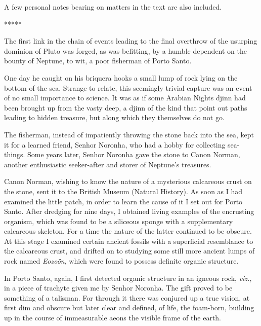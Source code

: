 \documentclass[a4paper, 12pt, oneside, landscape]{article}
\begin{document}
A few personal notes bearing on matters in the text are also included.

\centerline{*\hspace{15mm}*\hspace{15mm}*\hspace{15mm}*\hspace{15mm}*}
\bigskip

The first link in the chain of events leading to the final overthrow of the usurping dominion of Pluto was forged, as was befitting, by a humble dependent on the bounty of Neptune, to wit, a poor fisherman of Porto Santo.

One day he caught on his briquera hooks a small lump of rock lying on the bottom of the sea. Strange to relate, this seemingly trivial capture was an event of no small importance to science. It was as if some Arabian Nights djinn had been brought up from the vasty deep, a djinn of the kind that point out paths leading to hidden treasure, but along which they themselves do not go.

The fisherman, instead of impatiently throwing the stone back into the sea, kept it for a learned friend, Senhor Noronha, who had a hobby for collecting sea-things. Some years later, Senhor Noronha gave the stone to Canon Norman, another enthusiastic seeker-after and storer of Neptune's treasures.

Canon Norman, wishing to know the nature of a mysterious calcareous crust on the stone, sent it to the British Museum (Natural History). As soon as I had examined the little patch, in order to learn the cause of it I set out for Porto Santo. After dredging for nine days, I obtained living examples of the encrusting organism, which was found to be a siliceous sponge with a supplementary calcareous skeleton. For a time the nature of the latter continued to be obscure. At this stage I examined certain ancient fossils with a superficial resemblance to the calcareous crust, and drifted on to studying some still more ancient lumps of rock named \emph{Eozoön}, which were found to possess definite organic structure.

In Porto Santo, again, I first detected organic structure in an igneous rock, \emph{viz.}, in a piece of trachyte given me by Senhor Noronha. The gift proved to be something of a talisman. For through it there was conjured up a true vision, at first dim and obscure but later clear and defined, of life, the foam-born, building up in the course of immeasurable aeons the visible frame of the earth.
\end{document}

